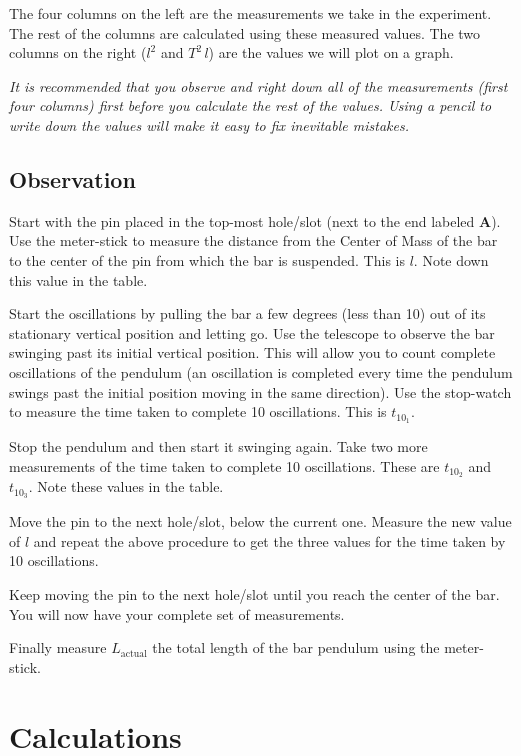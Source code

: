 \documentclass{article}
\begin{document}
         The four columns on the left are the measurements we take in the experiment. The rest of the columns are calculated using these measured values. The two columns on the right ($l^2$ and $T^2 \, l$) are the values we will plot on a graph.

         \textit{It is recommended that you observe and right down all of the measurements (first four columns) first before you calculate the rest of the values. Using a pencil to write down the values will make it easy to fix inevitable mistakes.}

      \subsection*{Observation}

      Start with the pin placed in the top-most hole/slot (next to the end labeled \textbf{A}). Use the meter-stick to measure the distance from the Center of Mass of the bar to the center of the pin from which the bar is suspended. This is $l$. Note down this value in the table.

      Start the oscillations by pulling the bar a few degrees (less than 10) out of its stationary vertical position and letting go. Use the telescope to observe the bar swinging past its initial vertical position. This will allow you to count complete oscillations of the pendulum (an oscillation is completed every time the pendulum swings past the initial position moving in the same direction). Use the stop-watch to measure the time taken to complete 10 oscillations. This is $t_{10_1}$.

      Stop the pendulum and then start it swinging again. Take two more measurements of the time taken to complete 10 oscillations. These are $t_{10_2}$ and $t_{10_3}$. Note these values in the table.

      Move the pin to the next hole/slot, below the current one. Measure the new value of $l$ and repeat the above procedure to get the three values for the time taken by 10 oscillations.

      Keep moving the pin to the next hole/slot until you reach the center of the bar. You will now have your complete set of measurements.

      Finally measure $L_\text{actual}$ the total length of the bar pendulum using the meter-stick.


   \section*{Calculations}
\end{document}
